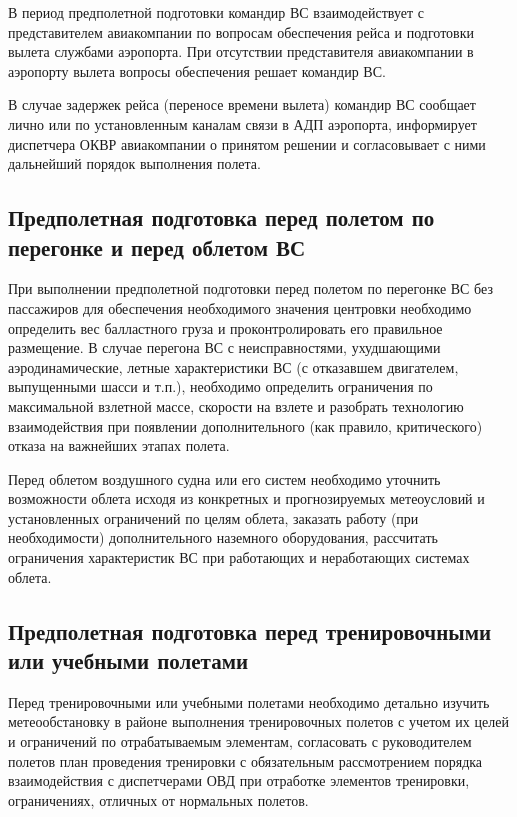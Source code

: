 В период предполетной подготовки командир ВС взаимодействует с представителем авиакомпании по вопросам обеспечения рейса и подготовки вылета службами аэропорта. При отсутствии представителя авиакомпании в аэропорту вылета вопросы обеспечения решает командир ВС.

В случае задержек рейса (переносе времени вылета) командир ВС сообщает лично или по установленным каналам связи в АДП аэропорта, информирует диспетчера ОКВР авиакомпании о принятом решении и согласовывает с ними дальнейший порядок выполнения полета.

\subsection{Предполетная подготовка перед полетом по перегонке и перед облетом ВС}


При выполнении предполетной подготовки перед полетом по перегонке ВС без пассажиров для обеспечения необходимого значения центровки необходимо определить вес балластного груза и проконтролировать его правильное размещение. В случае перегона ВС с неисправностями, ухудшающими аэродинамические, летные характеристики ВС (с отказавшем двигателем, выпущенными шасси и т.п.), необходимо определить ограничения по максимальной взлетной массе, скорости на взлете и разобрать технологию взаимодействия при появлении дополнительного (как правило, критического) отказа на важнейших этапах полета.

Перед облетом воздушного судна или его систем необходимо уточнить возможности облета исходя из конкретных и прогнозируемых метеоусловий и установленных ограничений по целям облета, заказать работу (при необходимости) дополнительного наземного оборудования, рассчитать ограничения характеристик ВС при работающих и неработающих системах облета.

\subsection{Предполетная подготовка перед тренировочными или учебными полетами}


Перед тренировочными или учебными полетами необходимо детально изучить метеообстановку в районе выполнения тренировочных полетов с учетом их целей и ограничений по отрабатываемым элементам, согласовать с руководителем полетов план проведения тренировки с обязательным рассмотрением порядка взаимодействия с диспетчерами ОВД при отработке элементов тренировки, ограничениях, отличных от нормальных полетов.

